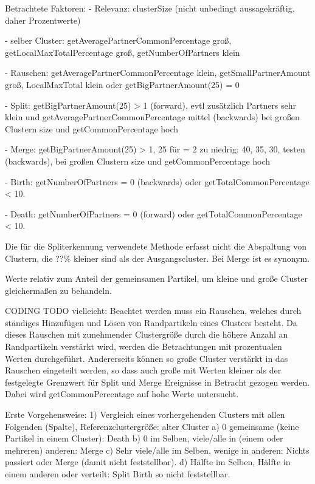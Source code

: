 Betrachtete Faktoren:
- Relevanz: clusterSize (nicht unbedingt aussagekräftig, daher Prozentwerte)

- selber Cluster: getAveragePartnerCommonPercentage groß, getLocalMaxTotalPercentage groß, getNumberOfPartners klein

- Rauschen: getAveragePartnerCommonPercentage klein, getSmallPartnerAmount groß, LocalMaxTotal klein oder  getBigPartnerAmount(25) = 0

- Split: getBigPartnerAmount(25) > 1 (forward), evtl zusätzlich Partners sehr klein und getAveragePartnerCommonPercentage mittel (backwards) bei großen Clustern size und getCommonPercentage hoch

- Merge: getBigPartnerAmount(25) > 1, 25 für = 2 zu niedrig: 40, 35, 30, testen (backwards), bei großen Clustern size und getCommonPercentage hoch

- Birth: getNumberOfPartners = 0 (backwards) oder getTotalCommonPercentage < 10.

- Death: getNumberOfPartners = 0 (forward) oder getTotalCommonPercentage < 10.

Die für die Spliterkennung verwendete Methode erfasst nicht die Abspaltung von Clustern, die ??\% kleiner sind als der Ausgangscluster. Bei Merge ist es synonym.

Werte relativ zum Anteil der gemeinsamen Partikel, um kleine und große Cluster gleichermaßen zu behandeln.

CODING TODO vielleicht:
Beachtet werden muss ein Rauschen, welches durch ständiges Hinzufügen und Lösen von Randpartikeln eines Clusters besteht. Da dieses Rauschen mit zunehmender Clustergröße durch die höhere Anzahl an Randpartikeln verstärkt wird, werden die Betrachtungen mit prozentualen Werten durchgeführt. Andererseits können so große Cluster verstärkt in das Rauschen eingeteilt werden, so dass auch große  mit Werten kleiner als der festgelegte Grenzwert für Split und Merge Ereignisse in Betracht gezogen werden. Dabei wird getCommonPercentage auf hohe Werte untersucht.



Erste Vorgehensweise:
1) Vergleich eines vorhergehenden Clusters mit allen Folgenden (Spalte), Referenzclustergröße: alter Cluster
a) 0 gemeinsame (keine Partikel in einem Cluster): Death
b) 0 im Selben, viele/alle in (einem oder mehreren) anderen: Merge
c) Sehr viele/alle im Selben, wenige in anderen: Nichts passiert oder Merge (damit nicht feststellbar).
d) Hälfte im Selben, Hälfte in einem anderen oder verteilt: Split
Birth so nicht feststellbar.

